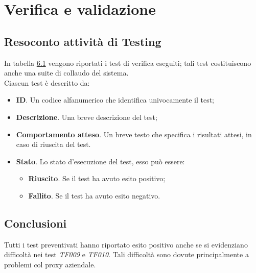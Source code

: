 
\pagestyle{IHA-fancy-style}
\chapter{Verifica e validazione}
\label{cap:verifica-validazione}


\section{Resoconto attività di Testing}

In tabella \hyperref[tab:test]{6.1} vengono riportati i test di verifica eseguiti; tali test costituiscono anche una suite di collaudo del sistema. \\

Ciascun test è descritto da:

\begin{itemize}
    \item \textbf{ID}. Un codice alfanumerico che identifica univocamente il test;
    \item \textbf{Descrizione}. Una breve descrizione del test;
    \item \textbf{Comportamento atteso}. Un breve testo che specifica i risultati attesi, in caso di riuscita del test.
    \item \textbf{Stato}. Lo stato d'esecuzione del test, esso può essere:
    \begin{itemize}
        \item \textbf{Riuscito}. Se il test ha avuto esito positivo;
        \item \textbf{Fallito}. Se il test ha avuto esito negativo.
    \end{itemize}
\end{itemize}



\section{Conclusioni}

Tutti i test preventivati hanno riportato esito positivo anche se si evidenziano difficoltà nei test \textit{TF009} e \textit{TF010}. Tali difficoltà sono dovute principalmente a problemi col proxy aziendale.